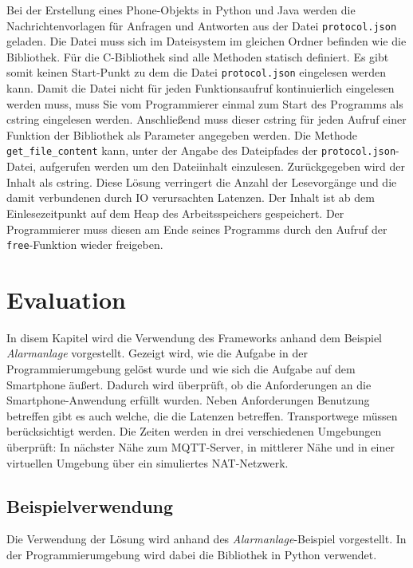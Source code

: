 \documentclass[11pt,a4paper]{report}
\begin{document}
Bei der Erstellung eines Phone-Objekts in Python und Java werden die Nachrichtenvorlagen für Anfragen und Antworten aus der Datei \texttt{protocol.json} geladen.
Die Datei muss sich im Dateisystem im gleichen Ordner befinden wie die Bibliothek.
Für die C-Bibliothek sind alle Methoden statisch definiert.
Es gibt somit keinen Start-Punkt zu dem die Datei \texttt{protocol.json} eingelesen werden kann.
Damit die Datei nicht für jeden Funktionsaufruf kontinuierlich eingelesen werden muss, muss Sie vom Programmierer einmal zum Start des Programms als cstring eingelesen werden.
Anschließend muss dieser cstring für jeden Aufruf einer Funktion der Bibliothek als Parameter angegeben werden.
Die Methode \texttt{get\_file\_content} kann, unter der Angabe des Dateipfades der \texttt{protocol.json}-Datei, aufgerufen werden um den Dateiinhalt einzulesen.
Zurückgegeben wird der Inhalt als cstring.
Diese Lösung verringert die Anzahl der Lesevorgänge und die damit verbundenen durch IO verursachten Latenzen.
Der Inhalt ist ab dem Einlesezeitpunkt auf dem Heap des Arbeitsspeichers gespeichert.
Der Programmierer muss diesen am Ende seines Programms durch den Aufruf der \texttt{free}-Funktion wieder freigeben.





\chapter{Evaluation}\label{chap:eval}
In disem Kapitel wird die Verwendung des Frameworks anhand dem Beispiel \textit{Alarmanlage} vorgestellt.
Gezeigt wird, wie die Aufgabe in der Programmierumgebung gelöst wurde und wie sich die Aufgabe auf dem Smartphone äußert.
Dadurch wird überprüft, ob die Anforderungen an die Smartphone-Anwendung erfüllt wurden.
Neben Anforderungen Benutzung betreffen gibt es auch welche, die die Latenzen betreffen.
Transportwege müssen berücksichtigt werden.
Die Zeiten werden in drei verschiedenen Umgebungen überprüft: In nächster Nähe zum MQTT-Server, in mittlerer Nähe und in einer virtuellen Umgebung über ein simuliertes NAT-Netzwerk.

\section{Beispielverwendung}
Die Verwendung der Lösung wird anhand des \textit{Alarmanlage}-Beispiel vorgestellt.
In der Programmierumgebung wird dabei die Bibliothek in Python verwendet.
\end{document}
